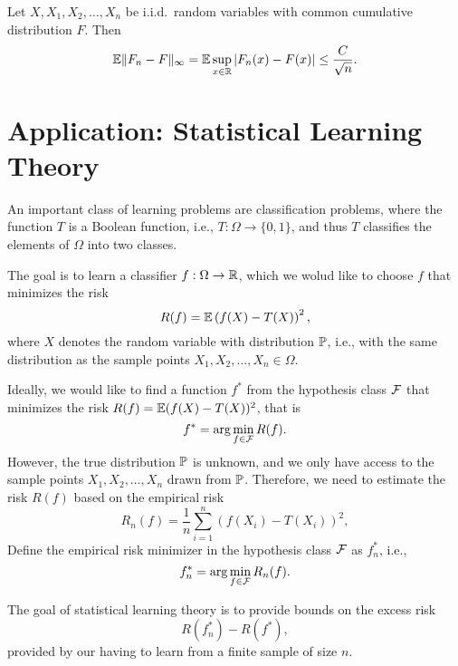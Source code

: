 \begin{theorem}
    Let \(X,X_{1},X_{2},\ldots,X_{n}\) be i.i.d.\ random variables with common cumulative distribution \(F\). Then
    \begin{equation*}
        {\mathbb E}\|F_{n}-F\|_{\infty}={\mathbb E}\sup_{x\in{\mathbb R}}|F_{n}(x)-F(x)|\leq\frac{C}{\sqrt{n}}.
    \end{equation*}
\end{theorem}

\section{Application: Statistical Learning Theory}

An important class of learning problems are classification problems, where the function \(T\) is a Boolean function, i.e., \(T:\Omega\to\{0,1\}\), and thus \(T\) classifies the elements of \(\Omega\) into two classes. 


The goal is to learn a classifier \(f:\Omega\to{\mathbb R}\), which we wolud like to choose \(f\) that minimizes the risk
\begin{equation*}
    R(f)={\mathbb E}\left(f(X)-T(X)\right)^{2},
\end{equation*}
where \(X\) denotes the random variable with distribution \({\mathbb P}\), i.e., with the same distribution as the sample points \(X_{1},X_{2},\ldots,X_{n}\in\Omega\).

Ideally, we would like to find a function \(f^{*}\) from the hypothesis class \({\mathcal F}\) that minimizes the risk \(R(f)={\mathbb E}(f(X)-T(X))^{2}\), that is 
\begin{equation*}
    f^{*}=\arg\min_{f\in{\mathcal F}}R(f).
\end{equation*}
However, the true distribution \({\mathbb P}\) is unknown, and we only have access to the sample points \(X_{1},X_{2},\ldots,X_{n}\) drawn from \({\mathbb P}\). Therefore, we need to estimate the risk \(R(f)\) based on the empirical risk
\begin{equation*}
    R_{n}(f)=\frac{1}{n}\sum_{i=1}^{n}(f(X_{i})-T(X_{i}))^{2},
\end{equation*}
Define the empirical risk minimizer in the hypothesis class \({\mathcal F}\) as \(f_{n}^{*}\), i.e.,
\begin{equation*}
    f_{n}^{*}=\arg\min_{f\in{\mathcal F}}R_{n}(f).
\end{equation*}

The goal of statistical learning theory is to provide bounds on the excess risk
\begin{equation*}
    R(f_{n}^{*})-R(f^{*}),
\end{equation*}
provided by our having to learn from a finite sample of size \(n\).

